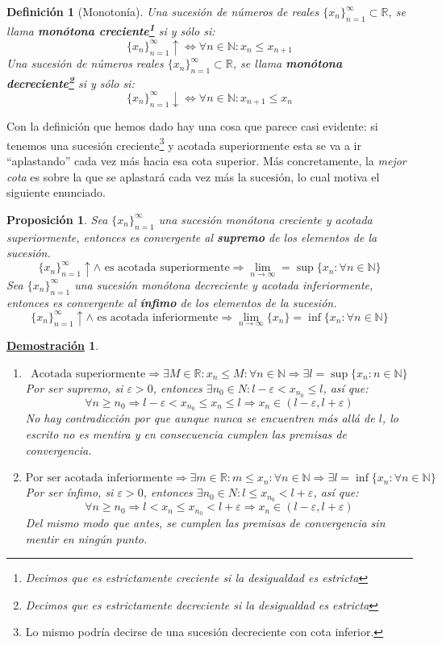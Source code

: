 \documentclass[10pt,a4paper,openright]{book}
\theoremstyle{break}
\newtheorem{defi}{Definición}[chapter]
\newtheorem{prop}{Proposición}[chapter]
\newtheorem*{demo}{\underline{Demostración}}
\begin{document}
\begin{defi}[Monotonía]
Una sucesión de números de reales $\{x_n\}_{n=1}^\infty\subset \mathbb R$, se llama \textbf{monótona creciente\footnote{Decimos que es estrictamente creciente si la desigualdad es estricta}} si y sólo si:
\[
\{x_n\}_{n=1}^\infty \uparrow \Leftrightarrow \forall n\in \mathbb N: x_n\leq x_{n+1}
\]
Una sucesión de números reales $\{x_n\}_{n=1}^\infty\subset \mathbb R$, se llama \textbf{monótona decreciente\footnote{Decimos que es estrictamente decreciente si la desigualdad es estricta}} si y sólo si:
\[
\{x_n\}_{n=1}^\infty \downarrow \Leftrightarrow \forall n\in \mathbb N: x_{n+1}\leq x_n
\]
\end{defi}

Con la definición que hemos dado hay una cosa que parece casi evidente: si tenemos una sucesión creciente\footnote{Lo mismo podría decirse de una sucesión decreciente con cota inferior.} y acotada superiormente esta se va a ir ``aplastando'' cada vez más hacia esa cota superior. Más concretamente, la \textit{mejor cota} es sobre la que se aplastará cada vez más la sucesión, lo cual motiva el siguiente enunciado.

\begin{prop}
Sea $\{x_n\}_{n=1}^\infty$ una sucesión monótona creciente y acotada superiormente, entonces es convergente al \textbf{supremo} de los elementos de la sucesión.
\[
\{x_n\}_{n=1}^\infty \uparrow \wedge \mbox{ es acotada superiormente}\Rightarrow \lim_{n\rightarrow \infty} = \sup\{x_n: \forall n\in \mathbb N\}
\]
Sea $\{x_n\}_{n=1}^\infty$ una sucesión monótona decreciente y acotada inferiormente, entonces es convergente al \textbf{ínfimo} de los elementos de la sucesión.
\[
\{x_n\}_{n=1}^\infty \uparrow \wedge \mbox{ es acotada inferiormente}\Rightarrow \lim_{n\rightarrow \infty} \{x_n\} = \inf\{x_n: \forall n\in \mathbb N\}
\]
\end{prop}
\begin{demo}
\begin{enumerate}
\item 
$$\mbox{Acotada superiormente}\Rightarrow \exists M\in \mathbb R: x_n\leq M: \forall n\in \mathbb N\Rightarrow \exists l=\sup\{x_n: n\in \mathbb N\}$$
Por ser supremo, si $\varepsilon>0$, entonces $\exists n_0\in N: l-\varepsilon<x_{n_0}\leq l$, así que:
$$\forall n\geq n_0\Rightarrow l-\varepsilon< x_{n_0}\leq x_n\leq l \Rightarrow x_n\in (l-\varepsilon, l+\varepsilon)$$
No hay contradicción por que aunque nunca se encuentren más allá de $l$, lo escrito no es mentira y en consecuencia cumplen las premisas de convergencia.

\item 
$$\mbox{Por ser acotada inferiormente}\Rightarrow \exists m\in \mathbb R: m\leq x_n: \forall n\in \mathbb N\Rightarrow \exists l=\inf\{x_n: \forall n\in \mathbb N\}$$
Por ser ínfimo, si $\varepsilon>0$, entonces $\exists n_0\in N: l\leq x_{n_0}<l+\varepsilon$, así que:
$$\forall n\geq n_0\Rightarrow l< x_n\leq x_{n_0} <l+\varepsilon \Rightarrow x_n\in (l-\varepsilon, l+\varepsilon)$$
Del mismo modo que antes, se cumplen las premisas de convergencia sin mentir en ningún punto.
\end{enumerate}
\end{demo}
\end{document}
